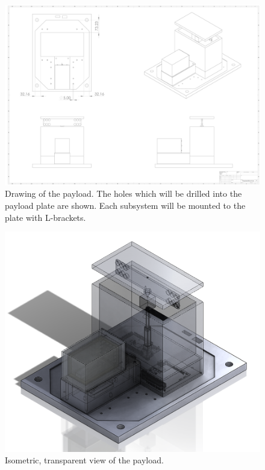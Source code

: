 \begin{centering}
  
  

  \begin{figure}[h]
    \includegraphics[width=\textwidth]{Figures/payload-structure-with-mount-holes.pdf}
    \caption{Drawing of the payload. The holes which will be drilled into the payload plate are shown. Each subsystem will be mounted to the plate with L-brackets. }
    \label{fig:payload-drawing}
  \end{figure}  
  \begin{figure}[h]
    \includegraphics[width=\textwidth]{Figures/payload-transparent.png}
    \caption{Isometric, transparent view of the payload.}
    \label{fig:payload-transparent}
  \end{figure}  
  

\end{centering}
